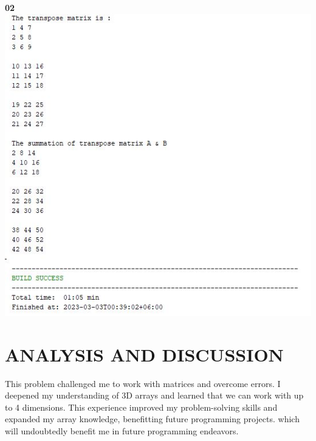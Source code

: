 \documentclass{article}
\begin{document}
\large \textbf{02}
\includegraphics[width=1\textwidth]{terminal2.JPG}
 \centering
 


 
\section{ANALYSIS AND DISCUSSION}
 This problem challenged me to work with matrices and overcome errors. I deepened my understanding of 3D arrays and learned that we can work with up to 4 dimensions. This experience improved my problem-solving skills and expanded my array knowledge, benefitting future programming projects. which will undoubtedly benefit me in future programming endeavors.
  

 
\end{document}
